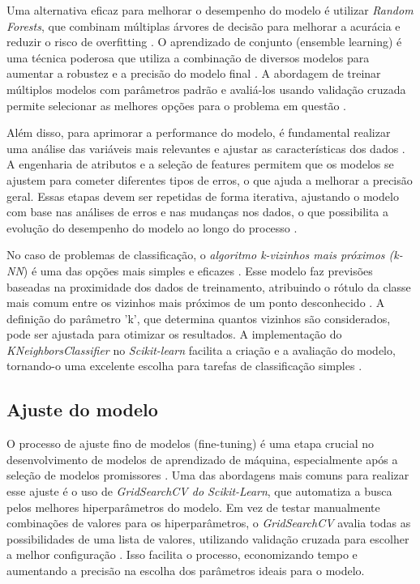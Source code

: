 Uma alternativa eficaz para melhorar o desempenho do modelo é utilizar \textit{Random Forests}, que combinam múltiplas árvores de decisão para melhorar a acurácia e reduzir o risco de overfitting \cite{geron2017}. O aprendizado de conjunto (ensemble learning) é uma técnica poderosa que utiliza a combinação de diversos modelos para aumentar a robustez e a precisão do modelo final \cite{geron2017}. A abordagem de treinar múltiplos modelos com parâmetros padrão e avaliá-los usando validação cruzada permite selecionar as melhores opções para o problema em questão \cite{geron2017}.

Além disso, para aprimorar a performance do modelo, é fundamental realizar uma análise das variáveis mais relevantes e ajustar as características dos dados \cite{geron2017}. A engenharia de atributos e a seleção de features permitem que os modelos se ajustem para cometer diferentes tipos de erros, o que ajuda a melhorar a precisão geral. Essas etapas devem ser repetidas de forma iterativa, ajustando o modelo com base nas análises de erros e nas mudanças nos dados, o que possibilita a evolução do desempenho do modelo ao longo do processo \cite{geron2017}.

No caso de problemas de classificação, o \textit{algoritmo k-vizinhos mais próximos (k-NN}) é uma das opções mais simples e eficazes \cite{muller2017}. Esse modelo faz previsões baseadas na proximidade dos dados de treinamento, atribuindo o rótulo da classe mais comum entre os vizinhos mais próximos de um ponto desconhecido \cite{muller2017}. A definição do parâmetro 'k', que determina quantos vizinhos são considerados, pode ser ajustada para otimizar os resultados. A implementação do \textit{KNeighborsClassifier} no \textit{Scikit-learn} facilita a criação e a avaliação do modelo, tornando-o uma excelente escolha para tarefas de classificação simples \cite{muller2017}.

\subsection{Ajuste do modelo}

O processo de ajuste fino de modelos (fine-tuning) é uma etapa crucial no desenvolvimento de modelos de aprendizado de máquina, especialmente após a seleção de modelos promissores \cite{geron2017}. Uma das abordagens mais comuns para realizar esse ajuste é o uso de \textit{GridSearchCV do Scikit-Learn}, que automatiza a busca pelos melhores hiperparâmetros do modelo. Em vez de testar manualmente combinações de valores para os hiperparâmetros, o \textit{GridSearchCV} avalia todas as possibilidades de uma lista de valores, utilizando validação cruzada para escolher a melhor configuração \cite{geron2017}. Isso facilita o processo, economizando tempo e aumentando a precisão na escolha dos parâmetros ideais para o modelo.

